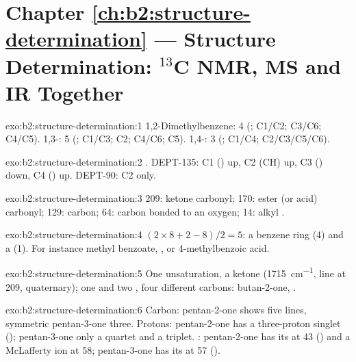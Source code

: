 \section*{Chapter \ref{ch:b2:structure-determination} --- Structure Determination: \texorpdfstring{$^{13}$C}{13C} NMR, MS and IR Together}

\begin{solution}{exo:b2:structure-determination:1}
1,2-Dimethylbenzene: 4 (; C1/C2; C3/C6; C4/C5). 1,3-: 5 (; C1/C3; C2; C4/C6; C5).
1,4-: 3 (; C1/C4; C2/C3/C5/C6).
\end{solution}

\begin{solution}{exo:b2:structure-determination:2}
. DEPT-135: C1 () up, C2 (CH) up, C3 () down, C4 () up.
DEPT-90: C2 only.
\end{solution}

\begin{solution}{exo:b2:structure-determination:3}
209: ketone carbonyl; 170: ester (or acid) carbonyl; 129:  carbon; 64: carbon bonded to an
oxygen; 14: alkyl .
\end{solution}

\begin{solution}{exo:b2:structure-determination:4}
$(2 \times 8 + 2 - 8)/2 = 5$: a benzene ring (4) and a  (1). For instance methyl benzoate,
, or 4-methylbenzoic acid.
\end{solution}

\begin{solution}{exo:b2:structure-determination:5}
One unsaturation, a ketone (\qty{1715}{cm^{-1}}, line at 209, quaternary); one  and two
, four different carbons: butan-2-one, .
\end{solution}

\begin{solution}{exo:b2:structure-determination:6}
Carbon: pentan-2-one shows five lines, symmetric pentan-3-one three. Protons: pentan-2-one has a
three-proton singlet (); pentan-3-one only a quartet and a triplet. : pentan-2-one
has its  at 43 () and a McLafferty ion at 58; pentan-3-one has its  at 57
().
\end{solution}

